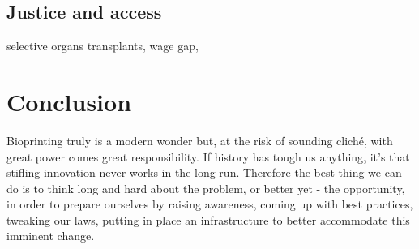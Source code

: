 \documentclass[12pt]{article} %
\begin{document}

\subsection{Justice and access} %
selective organs transplants,
wage gap,


\newpage 


\section{Conclusion} %

Bioprinting truly is a modern wonder but, at the risk of sounding cliché, with great power comes great responsibility. If history has tough us anything, it's that stifling innovation never works in the long run. Therefore the best thing we can do is to think long and hard about the problem, or better yet - the opportunity, in order to prepare ourselves by raising awareness, coming up with best practices, tweaking our laws, putting in place an infrastructure to better accommodate this imminent change.

\newpage

\end{document}
